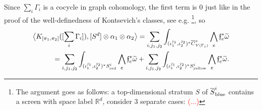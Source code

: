 \documentclass[11pt]{article}
\theoremstyle{definition}
\theoremstyle{remark}
\def\wt#1{\widetilde{#1}}
\def\ov#1{\overline{#1}}
\def\sred{{\textnormal{red}}}
\def\syellow{{\textnormal{yellow}}}
\def\sblue{{\textnormal{blue}}}
\def\R{\mathbb{R}}
\def\ff{\mathfrak{f}}
\def\cmt#1{\textcolor{red}{(#1)}}
\begin{document}
Since $\sum_{i}\Gamma_i$ is a cocycle in graph cohomology, the first term is 0 just like in the proof of the well-definedness of Kontsevich's classes, see e.g. \cite[Appendix E]{WatanabeAddendum}\footnote{
The argument goes as follows: a top-dimensional stratum $S$ of $\ov{S}_{\sblue}^i$ contains a screen with space label $\R^d$, consider 3 separate cases: \cmt{...}
}, 
so
\begin{align}\label{confstarintegral_eqn}
\big\langle K_{[\pi_1,\pi_2]}([\sum_i\Gamma_i]), [S^d]\otimes\alpha_1\otimes\alpha_2 \big\rangle=
\sum_{i,j_1,j_2}\int_{(\iota_1^{j_1},\iota_2^{j_2})^*\ov{C}^*_{V(\Gamma_i)}}\bigwedge_{e}\ff_e^*{\wt\omega}\nonumber\\
=
\sum_{i,j_1,j_2}\int_{(\iota_1^{j_1},\iota_2^{j_2})^*{S}_{\sred}^i}\bigwedge_{e}\ff_e^*{\wt\omega}+
\sum_{i,j_1,j_2}\int_{(\iota_1^{j_1},\iota_2^{j_2})^*{S}_{\syellow}^i}\bigwedge_{e}\ff_e^*{\wt\omega}.
\end{align}
\end{document}
